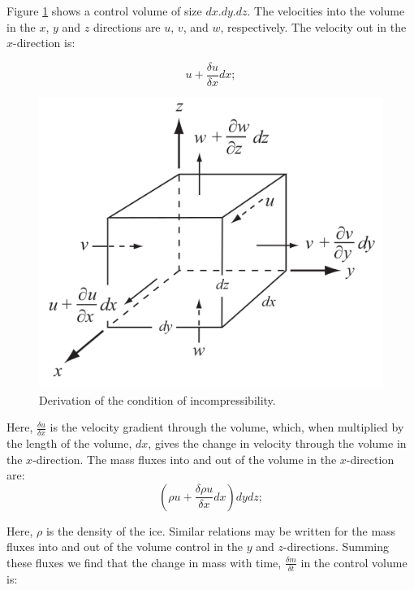 \documentclass{article}
\begin{document}
Figure \ref{control_volume} shows a control volume of size $dx.dy.dz$. The velocities into the volume in the $x$, $y$ and $z$ directions are $u$, $v$, and $w$, respectively. The velocity out in the $x$-direction is:

\begin{equation}
	u+\frac{\delta u}{\delta x}dx;
\end{equation}

\begin{figure}[!h]
	\centering
	\includegraphics[width=0.7\linewidth]{../fig/Control_volume.png}
	\caption{Derivation of the condition of incompressibility.}
	\label{control_volume}
\end{figure}

Here, $\frac{\delta u}{\delta x}$ is the velocity gradient through the volume, which, when multiplied by the length of the volume, $dx$, gives the change in velocity through the volume in the $x$-direction. The mass fluxes into and out of the volume in the $x$-direction are:
\begin{equation}
	({\rho u + \frac{\delta \rho u}{\delta x}dx})dy dz;
\end{equation}

Here, $\rho$ is the density of the ice. Similar relations may be written for the mass fluxes into and out of the volume control in the $y$ and $z$-directions. Summing these fluxes we find that the change in mass with time, $\frac{\delta m}{\delta t}$ in the control volume is:
\end{document}
